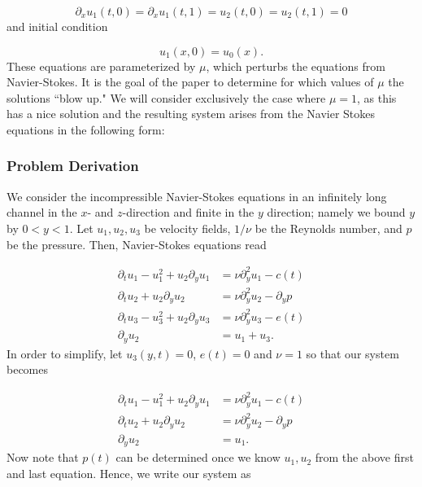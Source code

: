 \documentclass{CUP-JNL-DTM}%
\theoremstyle{definition}
\numberwithin{equation}{section}
\begin{document}
\begin{equation}
    \partial_x u_1(t,0) = \partial_x u_1(t,1) = u_2(t,0) = u_2(t,1) = 0
\end{equation}
and initial condition 

\begin{equation}
    u_1(x,0) = u_0(x).  
\end{equation}
These equations are parameterized by $\mu$, which perturbs the equations from Navier-Stokes. It is the goal of the paper to determine for which values of $\mu$ the solutions ``blow up." We will consider exclusively the case where $\mu = 1$, as this has a nice solution and the resulting system arises from the Navier Stokes equations in the following form:

\subsubsection{Problem Derivation}

We consider the incompressible Navier-Stokes equations in an infinitely long channel in the $x$- and $z$-direction and finite in the $y$ direction; namely we bound $y$ by $0 < y < 1$. Let $u_1, u_2, u_3$ be velocity fields, $1/\nu$ be the Reynolds number, and $p$ be the pressure. Then, Navier-Stokes equations read

\begin{equation}
    \begin{split}
        \partial_t u_1 - u_1^2 + u_2\partial_yu_1 & = \nu \partial_y^2 u_1 - c(t) \\
        \partial_t u_2 + u_2 \partial_y u_2 & = \nu \partial_y^2 u_2 - \partial_y p \\
        \partial_t u_3 - u_3^2 + u_2\partial_y u_3 & = \nu \partial_y^2 u_3 - e(t) \\
        \partial_y u_2 & = u_1 + u_3. 
    \end{split}
\end{equation}
In order to simplify, let $u_3(y,t) = 0$, $e(t) = 0$ and $\nu = 1$ so that our system becomes 

\begin{equation}
    \begin{split}
        \partial_t u_1 - u_1^2 + u_2\partial_yu_1 & = \nu \partial_y^2 u_1 - c(t) \\
        \partial_t u_2 + u_2 \partial_y u_2 & = \nu \partial_y^2 u_2 - \partial_y p \\
        \partial_y u_2 & = u_1. 
    \end{split}
\end{equation}
Now note that $p(t)$ can be determined once we know $u_1, u_2$ from the above first and last equation. Hence, we write our system as 
\end{document}
